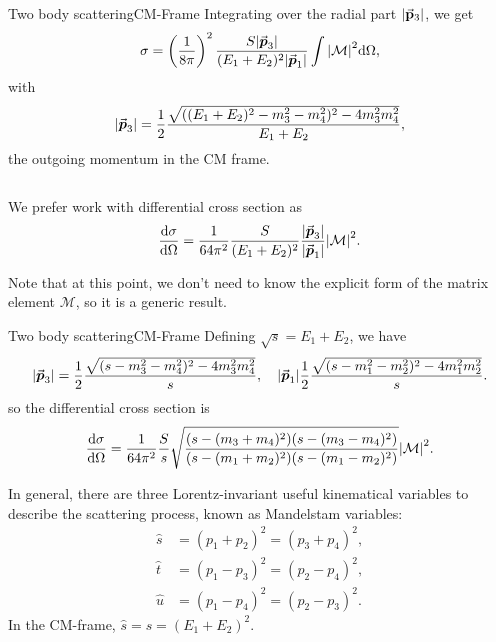 \documentclass{../bredelebeamer}
\begin{document}
\begin{frame}{Two body scattering}{CM-Frame}
    Integrating over the radial part $\abs{\va p_3}$, we get
    \begin{equation}
        \sigma = \left(\frac{1}{8\pi}\right)^2 \frac{S |\va*{p}_3|}{(E_1 +E_2)^2 \abs{\va*{p}_1}} \int \abs{\mathcal{M}}^2 \dd\Omega,
    \end{equation}
    with 
    \begin{equation}
        |\va*{p}_3| = \frac{1}{2} \frac{\sqrt{((E_1+E_2)^2 - m_3^2 -m_4^2)^2- 4m^2_3m^2_4} }{E_1+E_2},
    \end{equation}
    the outgoing momentum in the CM frame.

    $$ $$

    We prefer work with differential cross section as
    \begin{equation}
        \frac{\dd \sigma}{\dd \Omega} = \frac{1}{64\pi^2} \frac{S }{(E_1 +E_2)^2 } \frac{|\va*{p}_3|}{\abs{\va*{p}_1}} \abs{\mathcal{M}}^2.
    \end{equation}
   

    Note that at this point, we don't need to know the explicit form of the matrix element $\mathcal{M}$, so it is a generic result.
\end{frame}

\begin{frame}{Two body scattering}{CM-Frame}
    Defining $\sqrt s = E_1 + E_2$, we have
    \begin{equation}
        |\va*{p}_3| = \frac{1}{2} \frac{\sqrt{(s - m_3^2 -m_4^2)^2- 4m^2_3m^2_4} }{s}, \quad  |\va*{p}_1|\frac{1}{2} \frac{\sqrt{(s - m_1^2 -m_2^2)^2- 4m^2_1m^2_2} }{s}.
    \end{equation}
    so the differential cross section is
    \begin{equation}
        \frac{\dd \sigma}{\dd \Omega} = \frac{1}{64\pi^2} \frac{S }{s } 
        \sqrt{\frac{(s - (m_3 + m_4)^2)(s - (m_3 - m_4)^2)}{(s - (m_1 + m_2)^2)(s - (m_1 - m_2)^2)}}
        \abs{\mathcal{M}}^2.
    \end{equation}
    
    In general, there are three Lorentz-invariant useful kinematical variables to describe the scattering process, known as Mandelstam variables:
    \begin{align}
        \hat s &= (p_1 + p_2)^2 = (p_3 + p_4)^2,\\
        \hat t &= (p_1 - p_3)^2 = (p_2 - p_4)^2,\\
        \hat u &= (p_1 - p_4)^2 = (p_2 - p_3)^2.
    \end{align}
    In the CM-frame, $\hat s = s = (E_1+E_2)^2$.
\end{frame}

\begin{frame}
    
\end{frame}
\end{document}
